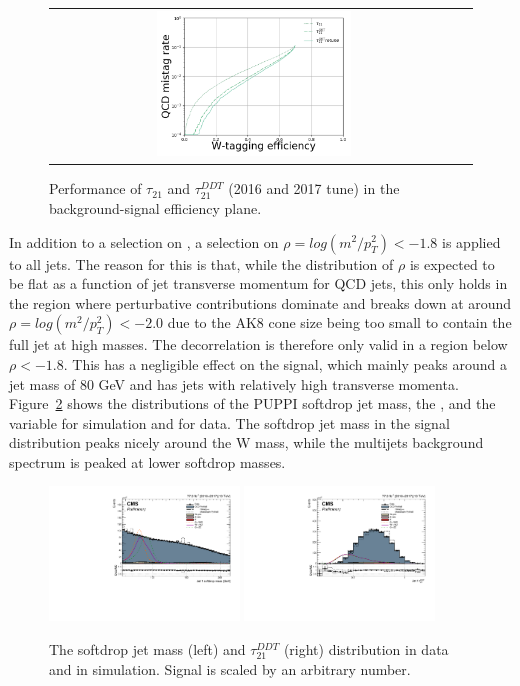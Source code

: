 \begin{figure}[h!]
\centering
\begin{tabular}{cc}
\includegraphics[width=0.49\textwidth]{figures/analysis/search3/AN-17-303/vtag/LoLa-comp-roc-simple.png}
\end{tabular}
\caption{Performance of $\tau_{21}$ and $\tau_{21}^{DDT}$ (2016 and 2017 tune) in the background-signal efficiency plane.}
\label{fig:roc}
\end{figure}
In addition to a selection on \ddt, a selection on $\rho = log(m^2/p_T^2) < -1.8 $ is applied to all jets.
The reason for this is that, while the distribution of $\rho$ is expected to be flat as a function of jet transverse momentum for QCD jets, this only holds in the region where perturbative contributions dominate and breaks down at around $\rho = log(m^2/p_T^2) < -2.0$ due to the AK8 cone size being too small to contain the full jet at high masses. The \ddt decorrelation is therefore only valid in a region below $\rho < -1.8 $. This has a negligible effect on the signal, which mainly peaks around a jet mass of 80 GeV and has jets with relatively high transverse momenta. Figure~\ref{fig:wtagCP} shows the distributions of the PUPPI softdrop jet mass, the \ddt, and the \nsubj variable for simulation and for data. The softdrop jet mass in the signal distribution peaks nicely around the W mass, while the multijets background spectrum is peaked at lower softdrop masses.
\begin{figure}[h!]
\centering
\includegraphics[width=0.450\textwidth]{figures/analysis/search3/B2G-18-002/looseSel_Jet_1_softdrop_mass.pdf}
\includegraphics[width=0.450\textwidth]{figures/analysis/search3/B2G-18-002/looseSel_Jet_1_DDT.pdf}\\
\caption{The softdrop jet mass (left) and $\tau_{21}^{DDT}$ (right) distribution in data and in simulation. Signal is scaled by an arbitrary number.}
\label{fig:wtagCP}
\end{figure}
